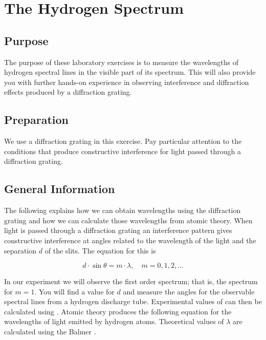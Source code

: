 \chapter{The Hydrogen Spectrum}

\begin{multicols}{2}
\section{Purpose}
  The purpose of these laboratory exercises is to measure the wavelengths of hydrogen spectral lines in the visible part of its spectrum.  This will also provide you with further hands-on experience in observing interference and diffraction effects produced by a diffraction grating.

\section{Preparation}
  We use a diffraction grating in this exercise. Pay particular attention to the conditions that produce constructive interference for light passed through a diffraction grating.
  
\section{General Information}
The following explains how we can obtain wavelengths using the diffraction grating and how we can calculate those wavelengths from atomic theory.
When light is passed through a diffraction grating an interference pattern gives constructive interference at angles  related to the wavelength  of the light and the separation $d$ of the slits.  The equation for this is

\begin{equation} \label{e:nfere} 
	d\cdot \sin\theta = m\cdot \lambda, \quad m = 0, 1, 2, \dots
\end{equation}

In our experiment we will observe the first order spectrum; that is, the spectrum for $m = 1$.  You will find a value for $d$ and measure the angles  for the observable spectral lines from a hydrogen discharge tube.  Experimental values of  can then be calculated using .
Atomic theory produces the following equation for the wavelengths of light emitted by hydrogen atoms.  Theoretical values of $\lambda$ are calculated using the Balmer .


\end{multicols}
